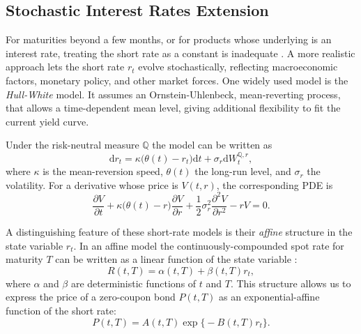 \documentclass[12pt]{report} %
\theoremstyle{plain} %
\theoremstyle{definition} %
\theoremstyle{remark} %
\begin{document}
\subsection{Stochastic Interest Rates Extension}\label{sec:sr_extension}

For maturities beyond a few months, or for products whose underlying is an interest rate, treating
the short rate as a constant is inadequate \cite{brigo2013interest}. A more realistic approach
lets the short rate \(r_t\) evolve stochastically, reflecting macroeconomic factors, monetary
policy, and other market forces. One widely used model is the \emph{Hull-White} \cite{hullwhitemodel} model. It assumes an
Ornstein-Uhlenbeck, mean-reverting process, that allows a
time-dependent mean level, giving additional flexibility to fit the current yield curve.

Under the risk-neutral measure \(\mathbb{Q}\) the model can be written as
\begin{equation}\label{eq:vasicek_sde}
 \mathrm{d}r_t
 = \kappa\bigl(\theta(t)-r_t\bigr) \mathrm{d}t
 + \sigma_r \mathrm{d}W_t^{\mathbb{Q},r},
\end{equation}
where \(\kappa\) is the mean-reversion speed, \(\theta(t)\) the long-run level, and \(\sigma_r\) the volatility.
For a derivative whose price is \(V(t,r)\), the corresponding PDE is
\begin{equation}\label{eq:vasicek_pde}
 \frac{\partial V}{\partial t}
 + \kappa\bigl(\theta(t)-r\bigr)\frac{\partial V}{\partial r}
 + \frac12\sigma_r^{2}\frac{\partial^{2}V}{\partial r^{2}}
 - rV
 = 0.
\end{equation}

A distinguishing feature of these short-rate models is their \emph{affine} structure in the state
variable \(r_t\). In an affine model the continuously-compounded spot rate for maturity \(T\) can be
written as a linear function of the state variable \cite{brigo2013interest}:
\[
 R(t,T) = \alpha(t,T) + \beta(t,T) r_t,
\]
where \(\alpha\) and \(\beta\) are deterministic functions of \(t\) and \(T\).
This structure allows us to express the price of a zero-coupon bond \(P(t,T)\) as an exponential-affine function of the short rate:
\begin{equation}\label{eq:vasicek_zcb}
 P(t,T) = A(t,T) \exp\bigl\{-B(t,T) r_t\bigr\}.
\end{equation}
\end{document}
